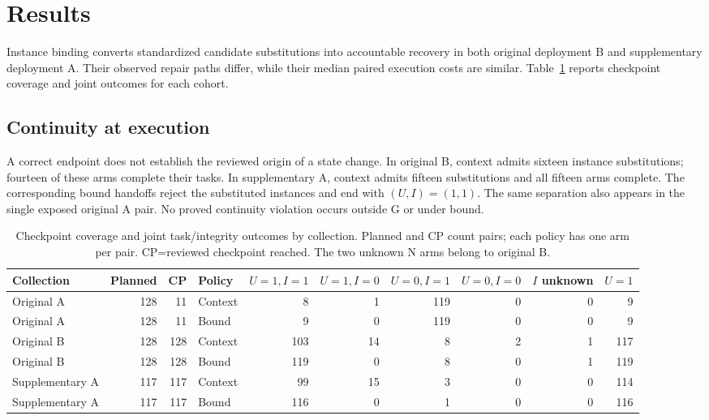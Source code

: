 \documentclass[10pt,a4paper,twocolumn]{article}
\begin{document}
\section{Results}
Instance binding converts standardized candidate substitutions into accountable recovery in both original deployment B and supplementary deployment A. Their observed repair paths differ, while their median paired execution costs are similar. Table~\ref{tab:joint} reports checkpoint coverage and joint outcomes for each cohort.

\subsection{Continuity at execution}
A correct endpoint does not establish the reviewed origin of a state change. In original B, context admits sixteen instance substitutions; fourteen of these arms complete their tasks. In supplementary A, context admits fifteen substitutions and all fifteen arms complete. The corresponding bound handoffs reject the substituted instances and end with $(U,I)=(1,1)$. The same separation also appears in the single exposed original A pair. No proved continuity violation occurs outside G or under bound.

\begin{table}[t]
\centering\small
\caption{Checkpoint coverage and joint task/integrity outcomes by collection. Planned and CP count pairs; each policy has one arm per pair. CP=reviewed checkpoint reached. The two unknown N arms belong to original B.}
\label{tab:joint}
\setlength{\tabcolsep}{3.8pt}
\begin{tabular}{@{}lrrlrrrrrr@{}}
\toprule
Collection & Planned & CP & Policy & $U=1,I=1$ & $U=1,I=0$ & $U=0,I=1$ & $U=0,I=0$ & $I$ unknown & $U=1$ \\
\midrule
Original A & 128 & 11 & Context & 8 & 1 & 119 & 0 & 0 & 9 \\
Original A & 128 & 11 & Bound & 9 & 0 & 119 & 0 & 0 & 9 \\
Original B & 128 & 128 & Context & 103 & 14 & 8 & 2 & 1 & 117 \\
Original B & 128 & 128 & Bound & 119 & 0 & 8 & 0 & 1 & 119 \\
Supplementary A & 117 & 117 & Context & 99 & 15 & 3 & 0 & 0 & 114 \\
Supplementary A & 117 & 117 & Bound & 116 & 0 & 1 & 0 & 0 & 116 \\
\bottomrule
\end{tabular}
\end{table}
\end{document}
